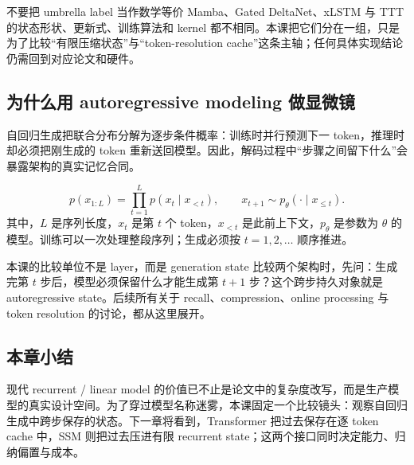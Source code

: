 \begin{warningbox}{不要把 umbrella label 当作数学等价}
Mamba、Gated DeltaNet、xLSTM 与 TTT 的状态形状、更新式、训练算法和 kernel 都不相同。本课把它们分在一组，只是为了比较“有限压缩状态”与“token-resolution cache”这条主轴；任何具体实现结论仍需回到对应论文和硬件。
\end{warningbox}

\subsection{为什么用 autoregressive modeling 做显微镜}

自回归生成把联合分布分解为逐步条件概率：训练时并行预测下一 token，推理时却必须把刚生成的 token 重新送回模型。因此，解码过程中“步骤之间留下什么”会暴露架构的真实记忆合同。

\[
p(x_{1:L})=\prod_{t=1}^{L}p(x_t\mid x_{<t}),
\qquad
x_{t+1}\sim p_\theta(\cdot\mid x_{\le t}).
\]
其中，$L$ 是序列长度，$x_t$ 是第 $t$ 个 token，$x_{<t}$ 是此前上下文，$p_\theta$ 是参数为 $\theta$ 的模型。训练可以一次处理整段序列；生成必须按 $t=1,2,\ldots$ 顺序推进。



\begin{importantbox}{本课的比较单位不是 layer，而是 generation state}
比较两个架构时，先问：生成完第 $t$ 步后，模型必须保留什么才能生成第 $t+1$ 步？这个跨步持久对象就是 autoregressive state。后续所有关于 recall、compression、online processing 与 token resolution 的讨论，都从这里展开。
\end{importantbox}

\subsection{本章小结}

现代 recurrent / linear model 的价值已不止是论文中的复杂度改写，而是生产模型的真实设计空间。为了穿过模型名称迷雾，本课固定一个比较镜头：观察自回归生成中跨步保存的状态。下一章将看到，Transformer 把过去保存在逐 token cache 中，SSM 则把过去压进有限 recurrent state；这两个接口同时决定能力、归纳偏置与成本。

